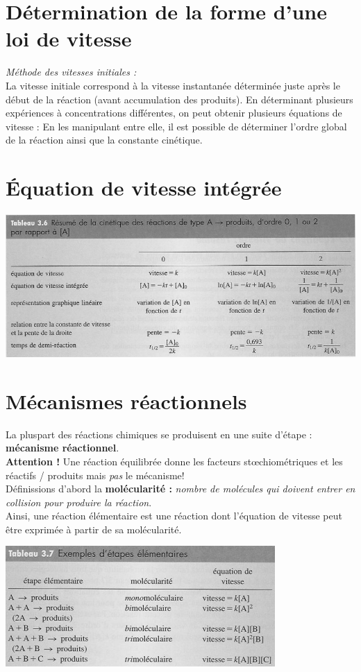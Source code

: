\documentclass[british,french,11pt, a4paper, openany]{book}
\begin{document}
\section{Détermination de la forme d'une loi de vitesse}
\textit{Méthode des vitesses initiales :}\\
La vitesse initiale correspond à la vitesse instantanée déterminée juste après le début de la réaction (avant accumulation des produits). En déterminant plusieurs expériences à concentrations différentes, on peut obtenir plusieurs équations de vitesse :  En les manipulant entre elle, il est possible de déterminer l'ordre global de la réaction ainsi que la constante cinétique.
\section{Équation de vitesse intégrée}
\begin{center}
	\includegraphics[scale=0.70]{image1.png}\\
\end{center}
\section{Mécanismes réactionnels}
La pluspart des réactions chimiques se produisent en une suite d'étape : \textbf{mécanisme réactionnel}.\\

\textbf{Attention !} Une réaction équilibrée donne les facteurs stœchiométriques et les réactifs / produits mais \textit{pas} le mécanisme!
\\
Définissions d'abord la \textbf{molécularité :} \textit{nombre de molécules qui doivent entrer en collision pour produire la réaction}.\\
Ainsi, une réaction élémentaire est une réaction dont l'équation de vitesse peut être exprimée à partir de sa molécularité.
\begin{center}
	\includegraphics[scale=0.70]{image2.png}\\
\end{center}
\end{document}
